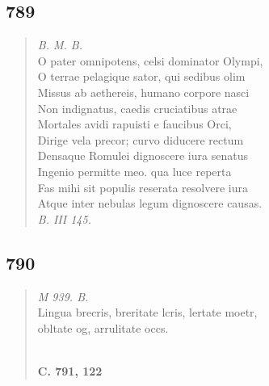 \documentclass[11pt, a4paper]{report}
\begin{document}
            \subsection*{789}
      \begin{verse}
      \textit{B. M. B.} \\ O pater omnipotens, celsi dominator Olympi, \\ O terrae pelagique sator, qui sedibus olim \\ Missus ab aethereis, humano corpore nasci \\ Non indignatus, caedis cruciatibus atrae \\ Mortales avidi rapuisti e faucibus Orci, \\ Dirige vela precor; curvo diducere rectum \\ Densaque Romulei dignoscere iura senatus \\ Ingenio permitte meo. qua luce reperta \\ Fas mihi sit populis reserata resolvere iura \\ Atque inter nebulas legum dignoscere causas. \\ \textit{B. III 145.} \\ 
      \end{verse}
  
            \subsection*{790}
      \begin{verse}
      \textit{M 939. B.} \\ Lingua brecris, breritate lcris, lertate moetr, \\  \lbrack obltate og, arrulitate occs. \\ 
        ﻿\pagebreak 
    \begin{center} \textbf{C. 791, 122} \end{center} \marginpar{[269]} 
      \end{verse}
  
\end{document}

